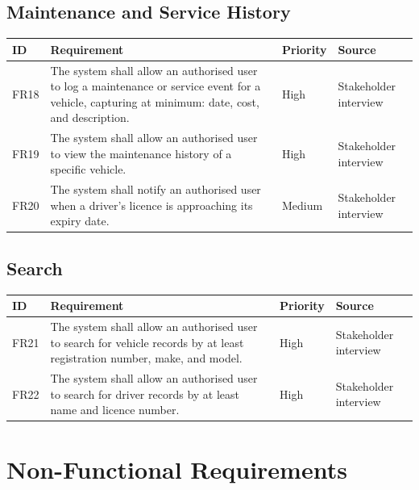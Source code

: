 \documentclass[11pt,a4paper]{article}
\begin{document}
\subsection{Maintenance and Service History}
\begin{longtable}{@{}p{1.3cm}p{9.2cm}p{1.6cm}p{2.4cm}@{}}
\toprule
ID & Requirement & Priority & Source \\
\midrule
\endhead
FR18 & The system shall allow an authorised user to log a maintenance or
service event for a vehicle, capturing at minimum: date, cost, and
description. & High & Stakeholder interview \\
FR19 & The system shall allow an authorised user to view the maintenance
history of a specific vehicle. & High & Stakeholder interview \\
FR20 & The system shall notify an authorised user when a driver's licence
is approaching its expiry date. & Medium & Stakeholder interview \\
\bottomrule
\end{longtable}

\subsection{Search}
\begin{longtable}{@{}p{1.3cm}p{9.2cm}p{1.6cm}p{2.4cm}@{}}
\toprule
ID & Requirement & Priority & Source \\
\midrule
\endhead
FR21 & The system shall allow an authorised user to search for vehicle
records by at least registration number, make, and model. & High &
Stakeholder interview \\
FR22 & The system shall allow an authorised user to search for driver
records by at least name and licence number. & High & Stakeholder
interview \\
\bottomrule
\end{longtable}

\section{Non-Functional Requirements}
\end{document}
